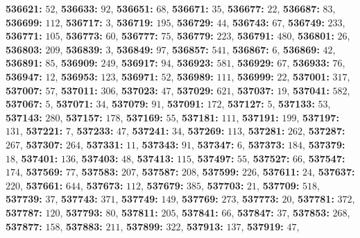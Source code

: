 \textsf{\bfseries 536621:} $52$, \textsf{\bfseries 536633:} $92$, \textsf{\bfseries 536651:} $68$, \textsf{\bfseries 536671:} $35$, \textsf{\bfseries 536677:} $22$, \textsf{\bfseries 536687:} $83$, \textsf{\bfseries 536699:} $112$, \textsf{\bfseries 536717:} $3$, \textsf{\bfseries 536719:} $195$, \textsf{\bfseries 536729:} $44$, \textsf{\bfseries 536743:} $67$, \textsf{\bfseries 536749:} $233$, \textsf{\bfseries 536771:} $105$, \textsf{\bfseries 536773:} $60$, \textsf{\bfseries 536777:} $75$, \textsf{\bfseries 536779:} $223$, \textsf{\bfseries 536791:} $480$, \textsf{\bfseries 536801:} $26$, \textsf{\bfseries 536803:} $209$, \textsf{\bfseries 536839:} $3$, \textsf{\bfseries 536849:} $97$, \textsf{\bfseries 536857:} $541$, \textsf{\bfseries 536867:} $6$, \textsf{\bfseries 536869:} $42$, \textsf{\bfseries 536891:} $85$, \textsf{\bfseries 536909:} $249$, \textsf{\bfseries 536917:} $94$, \textsf{\bfseries 536923:} $581$, \textsf{\bfseries 536929:} $67$, \textsf{\bfseries 536933:} $76$, \textsf{\bfseries 536947:} $12$, \textsf{\bfseries 536953:} $123$, \textsf{\bfseries 536971:} $52$, \textsf{\bfseries 536989:} $111$, \textsf{\bfseries 536999:} $22$, \textsf{\bfseries 537001:} $317$, \textsf{\bfseries 537007:} $57$, \textsf{\bfseries 537011:} $306$, \textsf{\bfseries 537023:} $47$, \textsf{\bfseries 537029:} $621$, \textsf{\bfseries 537037:} $19$, \textsf{\bfseries 537041:} $582$, \textsf{\bfseries 537067:} $5$, \textsf{\bfseries 537071:} $34$, \textsf{\bfseries 537079:} $91$, \textsf{\bfseries 537091:} $172$, \textsf{\bfseries 537127:} $5$, \textsf{\bfseries 537133:} $53$, \textsf{\bfseries 537143:} $280$, \textsf{\bfseries 537157:} $178$, \textsf{\bfseries 537169:} $55$, \textsf{\bfseries 537181:} $111$, \textsf{\bfseries 537191:} $199$, \textsf{\bfseries 537197:} $131$, \textsf{\bfseries 537221:} $7$, \textsf{\bfseries 537233:} $47$, \textsf{\bfseries 537241:} $34$, \textsf{\bfseries 537269:} $113$, \textsf{\bfseries 537281:} $262$, \textsf{\bfseries 537287:} $267$, \textsf{\bfseries 537307:} $264$, \textsf{\bfseries 537331:} $11$, \textsf{\bfseries 537343:} $91$, \textsf{\bfseries 537347:} $6$, \textsf{\bfseries 537373:} $184$, \textsf{\bfseries 537379:} $18$, \textsf{\bfseries 537401:} $136$, \textsf{\bfseries 537403:} $48$, \textsf{\bfseries 537413:} $115$, \textsf{\bfseries 537497:} $55$, \textsf{\bfseries 537527:} $66$, \textsf{\bfseries 537547:} $174$, \textsf{\bfseries 537569:} $77$, \textsf{\bfseries 537583:} $207$, \textsf{\bfseries 537587:} $208$, \textsf{\bfseries 537599:} $226$, \textsf{\bfseries 537611:} $24$, \textsf{\bfseries 537637:} $220$, \textsf{\bfseries 537661:} $644$, \textsf{\bfseries 537673:} $112$, \textsf{\bfseries 537679:} $385$, \textsf{\bfseries 537703:} $21$, \textsf{\bfseries 537709:} $518$, \textsf{\bfseries 537739:} $37$, \textsf{\bfseries 537743:} $371$, \textsf{\bfseries 537749:} $149$, \textsf{\bfseries 537769:} $273$, \textsf{\bfseries 537773:} $20$, \textsf{\bfseries 537781:} $372$, \textsf{\bfseries 537787:} $120$, \textsf{\bfseries 537793:} $80$, \textsf{\bfseries 537811:} $205$, \textsf{\bfseries 537841:} $66$, \textsf{\bfseries 537847:} $37$, \textsf{\bfseries 537853:} $268$, \textsf{\bfseries 537877:} $158$, \textsf{\bfseries 537883:} $211$, \textsf{\bfseries 537899:} $322$, \textsf{\bfseries 537913:} $137$, \textsf{\bfseries 537919:} $47$, 
